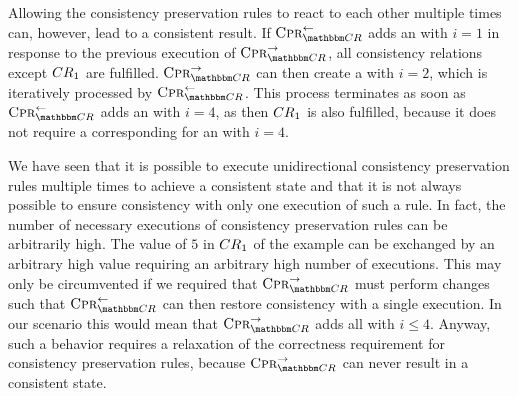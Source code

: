 Allowing the consistency preservation rules to react to each other multiple times can, however, lead to a consistent result.
If $\consistencypreservationrule{\consistencyrelationset{CR}}^{\leftarrow}$ adds an  with $i = 1$ in response to the previous execution of $\consistencypreservationrule{\consistencyrelationset{CR}}^{\rightarrow}$, all consistency relations except $\consistencyrelation{CR}{1}$ are fulfilled.
$\consistencypreservationrule{\consistencyrelationset{CR}}^{\rightarrow}$ can then create a  with $i = 2$, which is iteratively processed by $\consistencypreservationrule{\consistencyrelationset{CR}}^{\leftarrow}$.
This process terminates as soon as $\consistencypreservationrule{\consistencyrelationset{CR}}^{\leftarrow}$ adds an  with $i = 4$, as then $\consistencyrelation{CR}{1}$ is also fulfilled, because it does not require a corresponding  for an  with $i = 4$.

We have seen that it is possible to execute unidirectional consistency preservation rules multiple times to achieve a consistent state and that it is not always possible to ensure consistency with only one execution of such a rule.
In fact, the number of necessary executions of consistency preservation rules can be arbitrarily high.
The value of $5$ in $\consistencyrelation{CR}{1}$ of the example can be exchanged by an arbitrary high value requiring an arbitrary high number of executions.
This may only be circumvented if we required that $\consistencypreservationrule{\consistencyrelationset{CR}}^{\rightarrow}$ must perform changes such that $\consistencypreservationrule{\consistencyrelationset{CR}}^{\leftarrow}$ can then restore consistency with a single execution.
In our scenario this would mean that $\consistencypreservationrule{\consistencyrelationset{CR}}^{\rightarrow}$ adds all  with $i \leq 4$.
Anyway, such a behavior requires a relaxation of the correctness requirement for consistency preservation rules, because $\consistencypreservationrule{\consistencyrelationset{CR}}^{\rightarrow}$ can never result in a consistent state.

